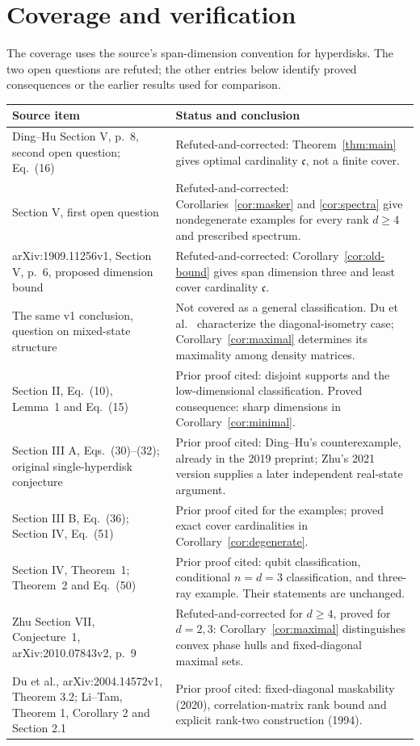 \documentclass[11pt]{article}
\begin{document}
\section{Coverage and verification}
The coverage uses the source's span-dimension convention for hyperdisks.
The two open questions are refuted; the other entries below identify
proved consequences or the earlier results used for comparison.
{\small
\begin{longtable}{@{}p{.34\linewidth}p{.60\linewidth}@{}}
\toprule Source item & Status and conclusion \\\midrule\endhead
Ding--Hu Section V, p.~8, second open question; Eq.~(16) &
Refuted-and-corrected: Theorem~\ref{thm:main} gives optimal cardinality
$\mathfrak c$, not a finite cover.\\
Section V, first open question &
Refuted-and-corrected: Corollaries~\ref{cor:masker} and \ref{cor:spectra}
give nondegenerate examples for every rank $d\ge4$ and prescribed spectrum.\\
arXiv:1909.11256v1, Section V, p.~6, proposed dimension bound &
Refuted-and-corrected: Corollary~\ref{cor:old-bound} gives span dimension
three and least cover cardinality $\mathfrak c$.\\
The same v1 conclusion, question on mixed-state structure &
Not covered as a general classification. Du et al.\ \cite{du}
characterize the diagonal-isometry case; Corollary~\ref{cor:maximal}
determines its maximality among density matrices.\\
Section II, Eq.~(10), Lemma~1 and Eq.~(15) &
Prior proof cited: disjoint supports and the low-dimensional classification.
Proved consequence: sharp dimensions in Corollary~\ref{cor:minimal}.\\
Section III A, Eqs.~(30)--(32); original single-hyperdisk conjecture &
Prior proof cited: Ding--Hu's counterexample, already in the 2019 preprint;
Zhu's 2021 version supplies a later independent real-state argument.\\
Section III B, Eq.~(36); Section IV, Eq.~(51) &
Prior proof cited for the examples; proved exact cover cardinalities
in Corollary~\ref{cor:degenerate}.\\
Section IV, Theorem~1; Theorem~2 and Eq.~(50) &
Prior proof cited: qubit classification, conditional $n=d=3$ classification,
and three-ray example. Their statements are unchanged.\\
Zhu Section VII, Conjecture~1, arXiv:2010.07843v2, p.~9 &
Refuted-and-corrected for $d\ge4$, proved for $d=2,3$:
Corollary~\ref{cor:maximal} distinguishes convex phase hulls and
fixed-diagonal maximal sets.\\
Du et al., arXiv:2004.14572v1, Theorem 3.2; Li--Tam, Theorem 1,
Corollary 2 and Section 2.1 &
Prior proof cited: fixed-diagonal maskability (2020), correlation-matrix
rank bound and explicit rank-two construction (1994).\\
\bottomrule
\end{longtable}}
\end{document}
